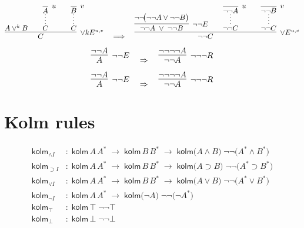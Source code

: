 \documentclass{article}
\begin{document}
\vspace{3em}
\[
\infer[\lor kE^{u,v}]{C}{
    {A \lor^{k} B}
    \hspace{2em}
    \infer*[]{C}{\infer[u]{A}{}}
    \hspace{2em}
    \infer*[]{C}{\infer[v]{B}{}}
}
\quad\Longrightarrow\quad
\infer[\lor E^{u,v}]{\neg\neg C}{
    \infer[\neg\neg E]{\neg\neg A \;\lor\; \neg\neg B}{
        \neg\neg\!\bigl(\neg\neg A \lor \neg\neg B\bigr)}
    \hspace{2em}
    \infer*[]{\neg\neg C}{
        \infer[u]{\neg\neg A}{}}
    \hspace{2em}
    \infer*[]{\neg\neg C}{
        \infer[v]{\neg\neg B}{}}
}
\]





\vspace{3em}
\[
\infer[\neg\neg E]{A}{
    \neg\neg A
}
\quad \Rightarrow \quad
\infer[\neg\neg\neg R]{\neg \neg A}{
    \neg\neg\neg\neg A
}
\]

\vspace{3em}
\[
\infer[\neg\neg E]{A}{
    \neg\neg A
}
\quad \Rightarrow \quad
\infer[\neg\neg\neg R]{\neg \neg A}{
    \neg\neg\neg\neg A
}
\]







\section{Kolm rules}
\newcommand{\kolm}{\mathsf{kolm}}   %
\newcommand{\nneg}{\neg\neg}            %

\begin{align*}
\kolm_{\land I}&:\;
  \kolm\,A\,A^{*}\;\to\;
  \kolm\,B\,B^{*}\;\to\;
  \kolm\!\bigl(A\!\land\!B\bigr)\;
  \nneg\!\bigl(A^{*}\land B^{*}\bigr) \\[4pt]
\kolm_{\supset I}&:\;
  \kolm\,A\,A^{*}\;\to\;
  \kolm\,B\,B^{*}\;\to\;
  \kolm\!\bigl(A\!\supset\!B\bigr)\;
  \nneg\!\bigl(A^{*}\supset B^{*}\bigr) \\[4pt]
\kolm_{\lor I}&:\;
  \kolm\,A\,A^{*}\;\to\;
  \kolm\,B\,B^{*}\;\to\;
  \kolm\!\bigl(A\!\lor\!B\bigr)\;
  \nneg\!\bigl(A^{*}\lor B^{*}\bigr) \\[4pt]
\kolm_{\neg I}&:\;
  \kolm\,A\,A^{*}\;\to\;
  \kolm\bigl(\neg A\bigr)\;
  \nneg\!\bigl(\neg A^{*}\bigr) \\[4pt]
\kolm_{\top}&:\;
  \kolm\,\top\;\nneg\top \\[4pt]
\kolm_{\bot}&:\;
  \kolm\,\bot\;\nneg\bot
\end{align*}
\end{document}
